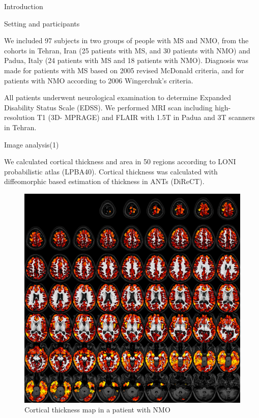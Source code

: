 \documentclass[final]{beamer}
\newlength{\onecolwid}
\begin{document}
\begin{frame}[t]
\begin{columns}[t]
\begin{column}{\onecolwid}
\begin{block}{Introduction}
\end{block}



\begin{block}{Setting and participants}

We included 97 subjects in two groups of people with MS and NMO, from the
cohorts in Tehran, Iran (25 patients with MS, and 30 patients with NMO) and Padua, 
Italy (24 patients with MS and 18 patients with NMO). Diagnosis was made for 
patients with MS based on 2005 revised McDonald criteria, and for patients with NMO 
according to 2006 Wingerchuk's criteria.

All patients underwent neurological examination to determine Expanded Disability 
Status Scale (EDSS). We performed MRI scan including high-resolution T1 (3D-
MPRAGE) and FLAIR with 1.5T in Padua and 3T scanners in Tehran.


\end{block}

\begin{block}{Image analysis(1)}

We calculated cortical thickness and area in 50 regions according to LONI probabilistic atlas (LPBA40). Cortical thickness was calculated with diffeomorphic based estimation of thickness in ANTs (DiReCT).

\begin{figure}
\includegraphics[width=0.9\linewidth]{NMO_THICKNESS_PAPER.png}
\caption{Cortical thickness map in a patient with NMO}
\end{figure}



\end{block}
\end{column}
\end{columns}
\end{frame}
\end{document}
